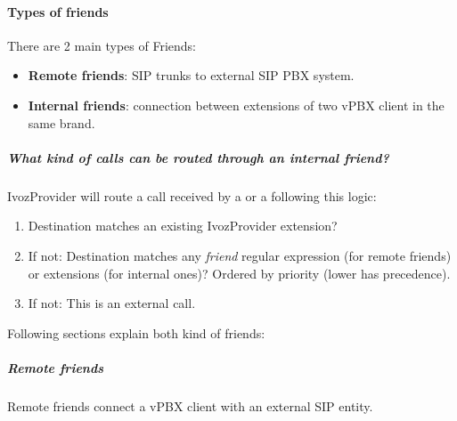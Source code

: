 \documentclass[letterpaper,10pt,english]{sphinxmanual}
\begin{document}
\paragraph{Types of friends}
\label{administration_portal/client/vpbx/routing_endpoints/friends/index:types-of-friends}
There are 2 main types of Friends:
\begin{itemize}
\item {} 
\textbf{Remote friends}: SIP trunks to external SIP PBX system.

\item {} 
\textbf{Internal friends}: connection between extensions of two vPBX client in the same brand.

\end{itemize}


\subparagraph{What kind of calls can be routed through an \emph{internal friend}?}
\label{administration_portal/client/vpbx/routing_endpoints/friends/index:what-kind-of-calls-can-be-routed-through-an-internal-friend}
IvozProvider will route a call received by a {\hyperref[administration_portal/client/vpbx/users:users]{}} or a {\hyperref[administration_portal/client/vpbx/routing_endpoints/friends/index:friends]{}} following this logic:
\begin{enumerate}
\item {} 
Destination matches an existing IvozProvider extension?

\item {} 
If not: Destination matches any \emph{friend} regular expression (for remote friends) or extensions (for internal ones)? Ordered by priority (lower has precedence).

\item {} 
If not: This is an external call.

\end{enumerate}

Following sections explain both kind of friends:


\subparagraph{Remote friends}
\label{administration_portal/client/vpbx/routing_endpoints/friends/remote_friends:remote-friends}\label{administration_portal/client/vpbx/routing_endpoints/friends/remote_friends::doc}
Remote friends connect a vPBX client with an external SIP entity.
\end{document}

